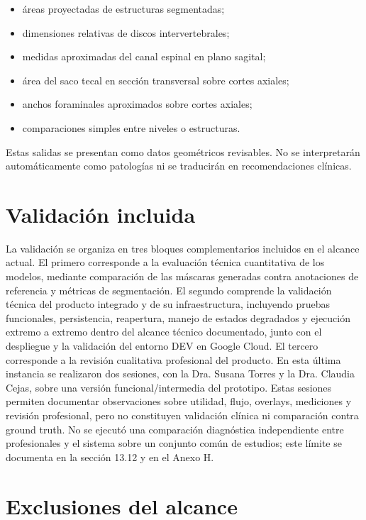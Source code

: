 \begin{itemize}
  \item áreas proyectadas de estructuras segmentadas;
  \item dimensiones relativas de discos intervertebrales;
  \item medidas aproximadas del canal espinal en plano sagital;
  \item área del saco tecal en sección transversal sobre cortes axiales;
  \item anchos foraminales aproximados sobre cortes axiales;
  \item comparaciones simples entre niveles o estructuras.
\end{itemize}

Estas salidas se presentan como datos geométricos revisables. No se interpretarán automáticamente como patologías ni se traducirán en recomendaciones clínicas.

\section{Validación incluida}

La validación se organiza en tres bloques complementarios incluidos en el alcance actual. El primero corresponde a la evaluación técnica cuantitativa de los modelos, mediante comparación de las máscaras generadas contra anotaciones de referencia y métricas de segmentación. El segundo comprende la validación técnica del producto integrado y de su infraestructura, incluyendo pruebas funcionales, persistencia, reapertura, manejo de estados degradados y ejecución extremo a extremo dentro del alcance técnico documentado, junto con el despliegue y la validación del entorno DEV en Google Cloud. El tercero corresponde a la revisión cualitativa profesional del producto. En esta última instancia se realizaron dos sesiones, con la Dra. Susana Torres y la Dra. Claudia Cejas, sobre una versión funcional/intermedia del prototipo. Estas sesiones permiten documentar observaciones sobre utilidad, flujo, overlays, mediciones y revisión profesional, pero no constituyen validación clínica ni comparación contra ground truth. No se ejecutó una comparación diagnóstica independiente entre profesionales y el sistema sobre un conjunto común de estudios; este límite se documenta en la sección 13.12 y en el Anexo H.

\section{Exclusiones del alcance}

